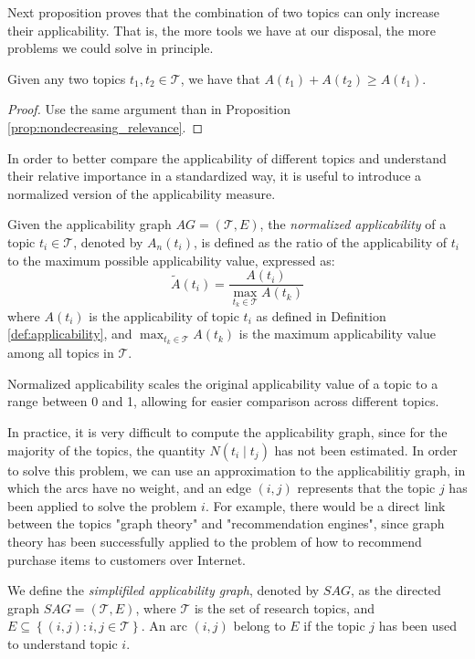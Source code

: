 Next proposition proves that the combination of two topics can only increase their applicability. That is, the more tools we have at our disposal, the more problems we could solve in principle.

\begin{proposition}
Given any two topics $t_1, t_2 \in \mathcal{T}$, we have that $A(t_1) + A(t_2) \geq A(t_1)$.
\end{proposition}
\begin{proof}
Use the same argument than in Proposition \ref{prop:nondecreasing_relevance}.
\end{proof}

In order to better compare the applicability of different topics and understand their relative importance in a standardized way, it is useful to introduce a normalized version of the applicability measure.

\begin{definition}
\label{def:normalized-applicability}
Given the applicability graph $AG = (\mathcal{T}, E)$, the \emph{normalized applicability} of a topic $t_i \in \mathcal{T}$, denoted by $A_n(t_i)$, is defined as the ratio of the applicability of $t_i$ to the maximum possible applicability value, expressed as:
\[
\tilde{A}(t_i) = \frac{A(t_i)}{\max_{t_k \in \mathcal{T}} A(t_k)}
\]
where $A(t_i)$ is the applicability of topic $t_i$ as defined in Definition \ref{def:applicability}, and $\max_{t_k \in \mathcal{T}} A(t_k)$ is the maximum applicability value among all topics in $\mathcal{T}$.
\end{definition}

Normalized applicability scales the original applicability value of a topic to a range between 0 and 1, allowing for easier comparison across different topics.

In practice, it is very difficult to compute the applicability graph, since for the majority of the topics, the quantity $N \left( t_i \mid t_j \right)$ has not been estimated. In order to solve this problem, we can use an approximation to the applicabilitiy graph, in which the arcs have no weight, and an edge $(i, j)$ represents that the topic $j$ has been applied to solve the problem $i$. For example, there would be a direct link between the topics "graph theory" and "recommendation engines", since graph theory has been successfully applied to the problem of how to recommend purchase items to customers over Internet.

\begin{definition}
\label{def:simplified-applicability-graph}
We define the \emph{simplifiled applicability graph}, denoted by $SAG$, as the directed graph $SAG = (\mathcal{T}, E)$, where $\mathcal{T}$ is the set of research topics, and $E\subseteq\left\{ (i,j):i,j\in \mathcal{T} \right\} $. An arc $(i, j)$ belong to $E$ if the topic $j$ has been used to understand topic $i$.
\end{definition}

